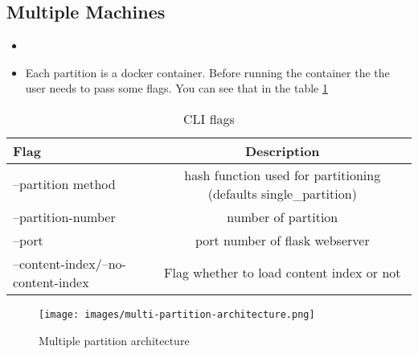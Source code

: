 \subsection{Multiple Machines}
\label{Multiple Machines}

\begin{itemize}
	\item 
	\item Each partition is a docker container. Before running the container the the user needs to pass some flags. You can see that in the table \ref{tab:cli-flags}
\end{itemize}

\begin{table}[!h]
	\centering
	\caption{CLI flags}
	\label{tab:cli-flags}
	\begin{tabular}{|l|c|}
		\hline
		\textbf{Flag} & \textbf{Description} \\
		\hline
		--partition method & hash function used for partitioning (defaults single\_partition) \\
		\hline
		--partition-number & number of partition \\
		\hline
		--port & port number of flask webserver \\
		\hline
		--content-index/--no-content-index & Flag whether to load content index or not \\
		\hline
	\end{tabular}
\end{table}

\begin{figure}[!h]
	\centering
	\texttt{[image: images/multi-partition-architecture.png]}
	\caption{Multiple partition architecture}
	\label{fig:multiple-machine-architecture}
\end{figure}
